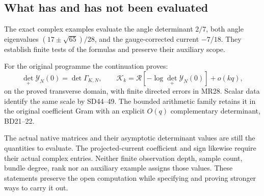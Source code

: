 \documentclass[11pt]{article}
\begin{document}
\subsection{What has and has not been evaluated}\label{what-has-and-has-not-been-evaluated}

The exact complex examples evaluate the angle determinant \(2/7\), both angle eigenvalues \((17\pm\sqrt{65})/28\), and the gauge-corrected current \(-7/18\). They establish finite tests of the formulas and preserve their auxiliary scope.

For the original programme the continuation proves: \[
\det_+\mathscr Y_N(0)=\det\Gamma_{K,N},\qquad
\mathcal K_k=\mathcal R[-\log\det_+\mathscr Y_N(0)]+o(kq),
\] on the proved transverse domain, with finite directed errors in MR28. Scalar data identify the same scale by SD44--49. The bounded arithmetic family retains it in the original coefficient Gram with an explicit \(O(q)\) complementary determinant, BD21--22.

The actual native matrices and their asymptotic determinant values are still the quantities to evaluate. The projected-current coefficient and sign likewise require their actual complex entries. Neither finite observation depth, sample count, bundle degree, rank nor an auxiliary example assigns those values. These statements preserve the open computation while specifying and proving stronger ways to carry it out.
\end{document}
